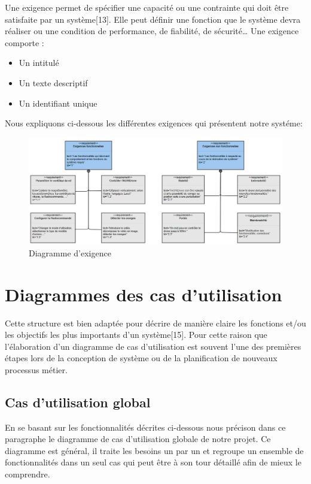 Une exigence permet de spécifier une capacité ou une contrainte qui doit être satisfaite par un système[13]. 
Elle peut définir une fonction que le système devra réaliser ou une condition de performance, de fiabilité, de sécurité… 
Une exigence comporte : 
\begin{itemize}
	\item Un intitulé 
	
	
	\item Un texte descriptif 
	
	
	\item Un identifiant unique
\end{itemize}
Nous expliquons ci-dessous les différentes exigences qui présentent notre systéme:
\begin{figure}[h] 
	\begin{center} 
		\centering
		\includegraphics[width=1.2\linewidth]{Images/Diagramme d'exigence}
		\caption{Diagramme d'exigence}
	\end{center}
\end{figure}	
\section{Diagrammes des cas d'utilisation }
Cette structure est bien adaptée pour décrire de manière claire les fonctions et/ou les objectifs les plus importants d’un système[15]. Pour cette raison que l’élaboration d’un diagramme de cas d’utilisation est souvent l’une des premières étapes lors de la conception de système ou de la planification de nouveaux processus métier. 

		\subsection{Cas d'utilisation global }
		
		En se basant sur les fonctionnalités décrites ci-dessous nous précison dans ce paragraphe le diagramme de cas d'utilisation globale de notre projet. Ce diagramme est général, il traite les besoins un par un et regroupe un ensemble de fonctionnalités dans un seul cas qui peut être à son tour détaillé afin de mieux le comprendre.
		
